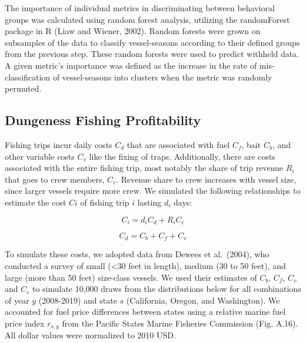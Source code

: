 \documentclass[]{elsarticle} %
\begin{document}
The importance of individual metrics in discriminating between
behavioral groups was calculated using random forest analysis, utilizing
the randomForest package in R (Liaw and Wiener, 2002). Random forests
were grown on subsamples of the data to classify vessel-seasons
according to their defined groups from the previous step. These random
forests were used to predict withheld data. A given metric's importance
was defined as the increase in the rate of mis-classification of
vessel-seasons into clusters when the metric was randomly permuted.

\hypertarget{dungeness-fishing-profitability}{%
\subsection{Dungeness Fishing
Profitability}\label{dungeness-fishing-profitability}}

Fishing trips incur daily costs \(C_d\) that are associated with fuel
\(C_f\), bait \(C_b\), and other variable costs \(C_v\) like the fixing
of traps. Additionally, there are costs associated with the entire
fishing trip, most notably the share of trip revenue \(R_i\) that goes
to crew members, \(C_c\). Revenue share to crew increases with vessel
size, since larger vessels require more crew. We simulated the following
relationships to estimate the cost \(Ci\) of fishing trip \(i\) lasting
\(d_i\) days:

\begin{equation}
  C_i = d_iC_d + R_iC_c 
\end{equation}

\begin{equation}
  C_d = C_b + C_f + C_v
\end{equation}

To simulate these costs, we adopted data from Dewees et al.~(2004), who
conducted a survey of small (\textless30 feet in length), medium (30 to
50 feet), and large (more than 50 feet) size-class vessels. We used
their estimates of \(C_b\), \(C_f\), \(C_v\) and \(C_c\) to simulate
10,000 draws from the distributions below for all combinations of year
\(y\) (2008-2019) and state \(s\) (California, Oregon, and Washington).
We accounted for fuel price differences between states using a relative
marine fuel price index \(r_{s,y}\) from the Pacific States Marine
Fisheries Commission (Fig. A.16). All dollar values were normalized to
2010 USD.
\end{document}

